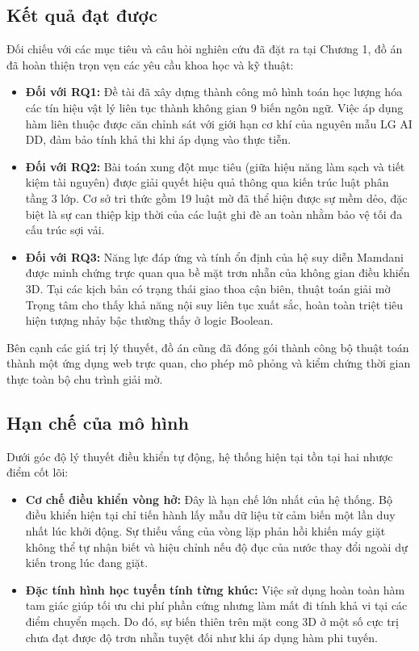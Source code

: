 \documentclass[12pt, a4paper]{article}
\begin{document}
\subsection{Kết quả đạt được}
Đối chiếu với các mục tiêu và câu hỏi nghiên cứu đã đặt ra tại Chương 1, đồ án đã hoàn thiện trọn vẹn các yêu cầu khoa học và kỹ thuật:
\begin{itemize}
    \item \textbf{Đối với RQ1:} Đề tài đã xây dựng thành công mô hình toán học lượng hóa các tín hiệu vật lý liên tục thành không gian 9 biến ngôn ngữ. Việc áp dụng hàm liên thuộc được căn chỉnh sát với giới hạn cơ khí của nguyên mẫu LG AI DD, đảm bảo tính khả thi khi áp dụng vào thực tiễn.
    \item \textbf{Đối với RQ2:} Bài toán xung đột mục tiêu (giữa hiệu năng làm sạch và tiết kiệm tài nguyên) được giải quyết hiệu quả thông qua kiến trúc luật phân tầng 3 lớp. Cơ sở tri thức gồm 19 luật mờ đã thể hiện được sự mềm dẻo, đặc biệt là sự can thiệp kịp thời của các luật ghi đè an toàn nhằm bảo vệ tối đa cấu trúc sợi vải.
    \item \textbf{Đối với RQ3:} Năng lực đáp ứng và tính ổn định của hệ suy diễn Mamdani được minh chứng trực quan qua bề mặt trơn nhẵn của không gian điều khiển 3D. Tại các kịch bản có trạng thái giao thoa cận biên, thuật toán giải mờ Trọng tâm cho thấy khả năng nội suy liên tục xuất sắc, hoàn toàn triệt tiêu hiện tượng nhảy bậc thường thấy ở logic Boolean.
\end{itemize}
Bên cạnh các giá trị lý thuyết, đồ án cũng đã đóng gói thành công bộ thuật toán thành một ứng dụng web trực quan, cho phép mô phỏng và kiểm chứng thời gian thực toàn bộ chu trình giải mờ.

\subsection{Hạn chế của mô hình}
Dưới góc độ lý thuyết điều khiển tự động, hệ thống hiện tại tồn tại hai nhược điểm cốt lõi:
\begin{itemize}
    \item \textbf{Cơ chế điều khiển vòng hở:} Đây là hạn chế lớn nhất của hệ thống. Bộ điều khiển hiện tại chỉ tiến hành lấy mẫu dữ liệu từ cảm biến một lần duy nhất lúc khởi động. Sự thiếu vắng của vòng lặp phản hồi khiến máy giặt không thể tự nhận biết và hiệu chỉnh nếu độ đục của nước thay đổi ngoài dự kiến trong lúc đang giặt.
    \item \textbf{Đặc tính hình học tuyến tính từng khúc:} Việc sử dụng hoàn toàn hàm tam giác giúp tối ưu chi phí phần cứng nhưng làm mất đi tính khả vi tại các điểm chuyển mạch. Do đó, sự biến thiên trên mặt cong 3D ở một số cực trị chưa đạt được độ trơn nhẵn tuyệt đối như khi áp dụng hàm phi tuyến.
\end{itemize}
\end{document}
